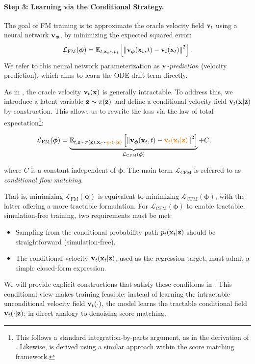 \paragraph{Step 3: Learning via the Conditional Strategy.}
The goal of FM training is to approximate the oracle velocity field ${\mathbf{v}}_t$ using a neural network ${\mathbf{v}}_{\bm{\phi}}$, by minimizing the expected squared error:
\[
\mathcal{L}_{\mathrm{FM}}(\bm{\phi}) = \mathbb{E}_{t, {\mathbf{x}}_t \sim p_t} \left[ \left\| {\mathbf{v}}_{\bm{\phi}}({\mathbf{x}}_t, t) - {\mathbf{v}}_t({\mathbf{x}}_t) \right\|^2 \right].
\]
We refer to this neural network parameterization as \emph{${\mathbf{v}}$-prediction} (velocity prediction), which aims to learn the ODE drift term directly.

As in , the oracle velocity ${\mathbf{v}}_t({\mathbf{x}})$ is generally intractable. To address this, we introduce a latent variable ${\mathbf{z}} \sim \pi({\mathbf{z}})$ and define a conditional velocity field ${\mathbf{v}}_t({\mathbf{x}} |{\mathbf{z}})$ by construction. This allows us to rewrite the loss via the law of total expectation\footnote{This follows a standard integration-by-parts argument, as in the derivation of . Likewise,  is derived using a similar approach within the score matching framework.
}:
\begin{mdframed}
    \begin{align}\label{eq:fm-cfm}
    \mathcal{L}_{\mathrm{FM}}(\bm{\phi}) 
    &= \underbrace{\mathbb{E}_{t, {\mathbf{z}} \sim \pi({\mathbf{z}}), {\mathbf{x}}_t \sim {\color{orange}p_t(\cdot |{\mathbf{z}})}} \left[ \left\| {\mathbf{v}}_{\bm{\phi}}({\mathbf{x}}_t, t) - {\color{orange}{\mathbf{v}}_t({\mathbf{x}}_t |{\mathbf{z}})} \right\|^2 \right]}_{\mathcal{L}_{\mathrm{CFM}}(\bm{\phi})} + C,
\end{align}
\end{mdframed}
where $C$ is a constant independent of $\bm{\phi}$. The main term $\mathcal{L}_{\mathrm{CFM}}$ is referred to as \emph{conditional flow matching}. 

That is, minimizing $\mathcal{L}_{\mathrm{FM}}(\bm{\phi})$ is equivalent to minimizing $\mathcal{L}_{\mathrm{CFM}}(\bm{\phi})$, with the latter offering a more tractable formulation. 
For $\mathcal{L}_{\mathrm{CFM}}(\bm{\phi})$ to enable tractable, simulation-free training, two requirements must be met:
\begin{itemize}
    \item[(i)] Sampling from the conditional probability path $p_t({\mathbf{x}}_t| {\mathbf{z}})$ should be straightforward (simulation-free).
    \item[(ii)] The conditional velocity ${\mathbf{v}}_t({\mathbf{x}}_t| {\mathbf{z}})$, used as the regression target, must admit a simple closed-form expression.
\end{itemize}
We will provide explicit constructions that satisfy these conditions in . This conditional view makes training feasible: instead of learning the intractable unconditional velocity field ${\mathbf{v}}_t(\cdot)$, the model learns the tractable conditional field ${\mathbf{v}}_t(\cdot| {\mathbf{z}})$: in direct analogy to denoising score matching.


